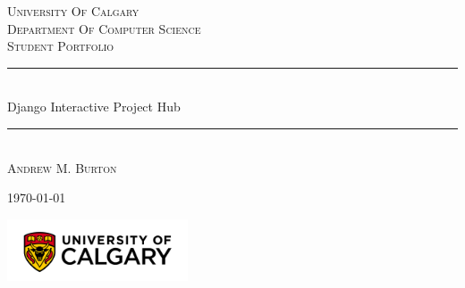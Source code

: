
\begin{titlepage}
    \begin{center}

        \vspace*{1cm}
        \normalfont\normalsize\textsc{University Of Calgary\\ Department Of Computer Science\\ Student Portfolio}\\ [8pt] \rule{\linewidth}{0.5pt}\\ [6pt] \huge Django Interactive Project Hub\\ \rule{\linewidth}{2pt} \\ [10pt]

        \vspace{1cm}
        \normalfont\Large\textsc{Andrew M. Burton}\\
        \vspace{1cm}

        \today\\

        \vspace{8cm}

        \includegraphics[width=0.4\textwidth]{assets/images/UCalgary Logo.png}
    \end{center}
\end{titlepage}